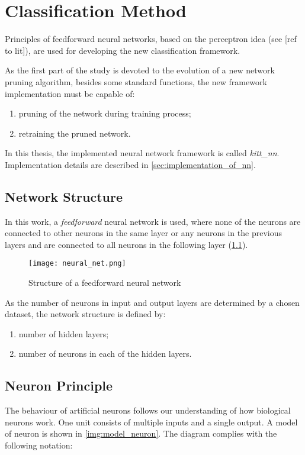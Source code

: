 \chapter{Classification Method} \label{chap:kitt_nn}
Principles of feedforward neural networks, based on the perceptron idea (see [ref to lit]), are used for developing the new classification framework.

As the first part of the study is devoted to the evolution of a new network pruning algorithm, besides some standard functions, the new framework implementation must be capable of:

\begin{enumerate}
\item pruning of the network during training process;
\item retraining the pruned network.
\end{enumerate}

In this thesis, the implemented neural network framework is called \textit{kitt\_nn}. Implementation details are described in \cref{sec:implementation_of_nn}.

\section{Network Structure} \label{sec:network_structure}
In this work, a \textit{feedforward} neural network is used, where none of the neurons are connected to other neurons in the same layer or any neurons in the previous layers and are connected to all neurons in the following layer (\cref{img:neural_net}).

\begin{figure}[H]
  \centering
  \texttt{[image: neural\_net.png]}
  \caption{Structure of a feedforward neural network}
  \label{img:neural_net}
\end{figure}

As the number of neurons in input and output layers are determined by a chosen dataset, the network structure is defined by:
\begin{enumerate}
\item number of hidden layers;
\item number of neurons in each of the hidden layers.
\end{enumerate}

\section{Neuron Principle} \label{sec:neuron_principle}
The behaviour of artificial neurons follows our understanding of how biological neurons work. One unit consists of multiple inputs and a single output. A model of neuron is shown in \cref{img:model_neuron}. The diagram complies with the following notation:

